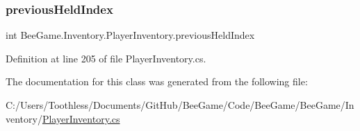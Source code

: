 \subsubsection{\texorpdfstring{previous\+Held\+Index}{previousHeldIndex}}
{\footnotesize\ttfamily int Bee\+Game.\+Inventory.\+Player\+Inventory.\+previous\+Held\+Index\hspace{0.3cm}{\ttfamily [private]}}



Definition at line 205 of file Player\+Inventory.\+cs.



The documentation for this class was generated from the following file\+:\begin{DoxyCompactItemize}
\item 
C\+:/\+Users/\+Toothless/\+Documents/\+Git\+Hub/\+Bee\+Game/\+Code/\+Bee\+Game/\+Bee\+Game/\+Inventory/\hyperlink{_player_inventory_8cs}{Player\+Inventory.\+cs}\end{DoxyCompactItemize}
